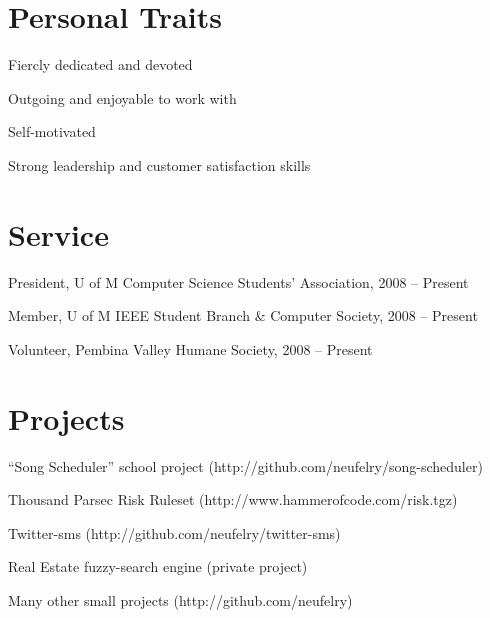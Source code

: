 \documentclass[margin,line,letterpaper]{resume}
\begin{document}
\begin{resume}
  \section{\mysidestyle Personal Traits}

  \begin{list2}
    \item Fiercly dedicated and devoted
    \item Outgoing and enjoyable to work with
    \item Self-motivated
    \item Strong leadership and customer satisfaction skills
  \end{list2}

  \section{\mysidestyle Service}

  \begin{list2}
    \item President, U of M Computer Science Students' Association, 2008 -- Present
    \item Member, U of M IEEE Student Branch \& Computer Society, 2008 -- Present
    \item Volunteer, Pembina Valley Humane Society, 2008 -- Present
  \end{list2}

  \newpage
  \section{\mysidestyle Projects}

  \begin{list2}
    \item ``Song Scheduler'' school project (http://github.com/neufelry/song-scheduler)
    \item Thousand Parsec Risk Ruleset (http://www.hammerofcode.com/risk.tgz)
    \item Twitter-sms (http://github.com/neufelry/twitter-sms)
    \item Real Estate fuzzy-search engine (private project)
    \item Many other small projects (http://github.com/neufelry)
  \end{list2}



\end{resume}
\end{document}
